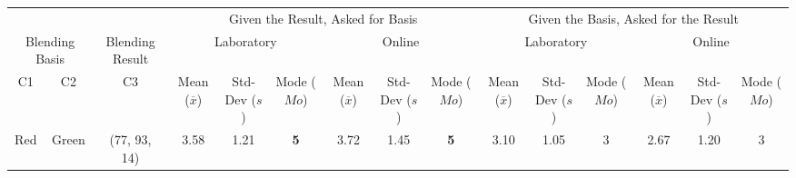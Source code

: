 \begin{table}[htbp]
  \centering
  \vspace{-5pt}
  \resizebox{\textwidth}{!} {
  \begin{tabular}{@{}ccclcccccccccccc@{}}
    \toprule
    \multicolumn{2}{c}{}                                                     & \multicolumn{2}{c}{}                                       & \multicolumn{6}{c}{Given the Result, Asked for Basis}                                                                                                                                                                               & \multicolumn{6}{c}{Given the Basis, Asked for the Result}                                                                                                                                                                                                                                                                   \\ \cmidrule(l){5-16}
    \multicolumn{2}{c}{\multirow{-2}{*}{Blending Basis}}                     & \multicolumn{2}{c}{\multirow{-2}{*}{Blending Result}}      & \multicolumn{3}{c}{Laboratory}                                                                                   & \multicolumn{3}{c}{Online}                                                                                       & \multicolumn{3}{c}{Laboratory}                                                                                                                      & \multicolumn{3}{c}{Online}                                                                                                                                            \\ \midrule
    C1                      & C2                                             & \multicolumn{2}{c|}{C3}                                    & Mean ($\overline{x}$)        & Std-Dev ($s$)         & Mode ($Mo$)                                             & Mean ($\overline{x}$)        & Std-Dev ($s$)         & \multicolumn{1}{c|}{Mode ($Mo$)}                        & Mean ($\overline{x}$)                          & Std-Dev ($s$)                          & Mode ($Mo$)                                             & Mean ($\overline{x}$)                          & Std-Dev ($s$)                          & \multicolumn{1}{c|}{Mode ($Mo$)}                                          \\ \midrule
    Red                     & \multicolumn{1}{c|}{Green}                     & \multicolumn{2}{c|}{\cellcolor[HTML]{FFFF00}(77, 93, 14)}  & \multicolumn{1}{c|}{3.58} & \multicolumn{1}{c|}{1.21}  & \multicolumn{1}{c|}{\cellcolor[HTML]{32CB00}\textbf{5}} & \multicolumn{1}{c|}{3.72} & \multicolumn{1}{c|}{1.45}  & \multicolumn{1}{c||}{\cellcolor[HTML]{32CB00}\textbf{5}} & \multicolumn{1}{c|}{3.10}                   & \multicolumn{1}{c|}{1.05}                   & \multicolumn{1}{c|}{3}                                  & \multicolumn{1}{c|}{2.67}                   & \multicolumn{1}{c|}{1.20}                   & \multicolumn{1}{c|}{3}                                                    \\ \midrule

\end{tabular}}
\end{table}

